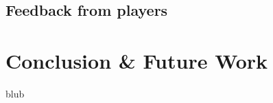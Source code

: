\documentclass[letterpaper, 10 pt, conference]{ieeeconf}  %
\begin{document}
\subsection{Feedback from players}



\section{Conclusion \& Future Work}
\label{Sec:ConcFuture}

blub










\printbibliography[
title={References},
notkeyword=game
]

\printbibliography[
title={Ludography},
keyword=game
]

\end{document}
